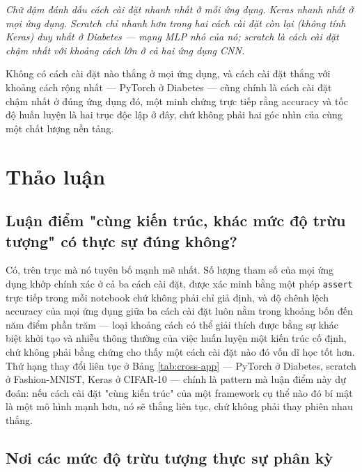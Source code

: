 \documentclass[11pt]{article}
\newcommand{\code}[1]{\texttt{#1}}
\begin{document}
\noindent\textit{Chữ đậm đánh dấu cách cài đặt nhanh nhất ở mỗi ứng dụng.
Keras nhanh nhất ở mọi ứng dụng. Scratch chỉ nhanh hơn trong hai cách cài
đặt còn lại (không tính Keras) duy nhất ở Diabetes — mạng MLP nhỏ của nó;
scratch là cách cài đặt chậm nhất với khoảng cách lớn ở cả hai ứng dụng
CNN.}

Không có cách cài đặt nào thắng ở mọi ứng dụng, và cách cài đặt thắng với
khoảng cách rộng nhất — PyTorch ở Diabetes — cũng chính là cách cài đặt
chậm nhất ở đúng ứng dụng đó, một minh chứng trực tiếp rằng accuracy và
tốc độ huấn luyện là hai trục độc lập ở đây, chứ không phải hai góc nhìn
của cùng một chất lượng nền tảng.

\section{Thảo luận}
\label{sec:discussion}

\subsection{Luận điểm "cùng kiến trúc, khác mức độ trừu tượng" có thực sự
đúng không?}

Có, trên trục mà nó tuyên bố mạnh mẽ nhất. Số lượng tham số của mọi ứng
dụng khớp chính xác ở cả ba cách cài đặt, được xác minh bằng một phép
\code{assert} trực tiếp trong mỗi notebook chứ không phải chỉ giả định, và
độ chênh lệch accuracy của mọi ứng dụng giữa ba cách cài đặt luôn nằm
trong khoảng bốn đến năm điểm phần trăm — loại khoảng cách có thể giải
thích được bằng sự khác biệt khởi tạo và nhiễu thông thường của việc huấn
luyện một kiến trúc cố định, chứ không phải bằng chứng cho thấy một cách
cài đặt nào đó vốn dĩ học tốt hơn. Thứ hạng thay đổi liên tục ở Bảng
\ref{tab:cross-app} — PyTorch ở Diabetes, scratch ở Fashion-MNIST, Keras ở
CIFAR-10 — chính là pattern mà luận điểm này dự đoán: nếu cách cài đặt
"cùng kiến trúc" của một framework cụ thể nào đó bí mật là một mô hình
mạnh hơn, nó sẽ thắng liên tục, chứ không phải thay phiên nhau thắng.

\subsection{Nơi các mức độ trừu tượng thực sự phân kỳ}
\end{document}
